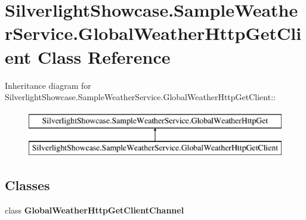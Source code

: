 \hypertarget{class_silverlight_showcase_1_1_sample_weather_service_1_1_global_weather_http_get_client}{
\section{SilverlightShowcase.SampleWeatherService.GlobalWeatherHttpGetClient Class Reference}
\label{class_silverlight_showcase_1_1_sample_weather_service_1_1_global_weather_http_get_client}
}
Inheritance diagram for SilverlightShowcase.SampleWeatherService.GlobalWeatherHttpGetClient::\begin{figure}[H]
\begin{center}
\leavevmode
\includegraphics[height=2cm]{class_silverlight_showcase_1_1_sample_weather_service_1_1_global_weather_http_get_client}
\end{center}
\end{figure}
\subsection*{Classes}
\begin{DoxyCompactItemize}
\item 
class {\bfseries GlobalWeatherHttpGetClientChannel}
\end{DoxyCompactItemize}
